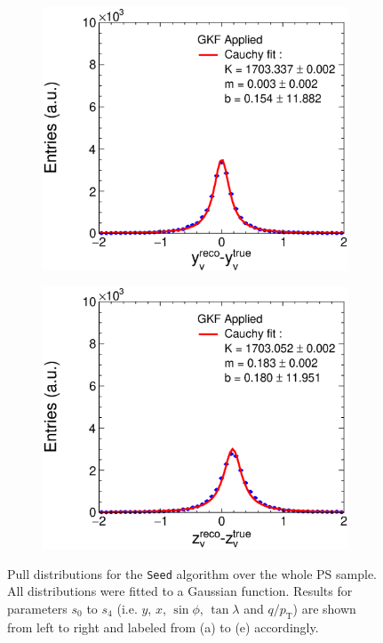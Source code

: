 \begin{figure}[t]
\begin{subfigure}{0.32\textwidth}
         \caption{}
         \label{fig:VertXGKF_Integration}
     \end{subfigure}
     \begin{subfigure}{0.32\textwidth}
         \centering
         \includegraphics[width=\textwidth]{figures/ch5-KF_NDGAr/FullSample/Integration/ResYGKF.eps}
         \caption{}
         \label{fig:VertYGKF_Integration}
     \end{subfigure}
    \begin{subfigure}{0.32\textwidth}
         \centering
         \includegraphics[width=\textwidth]{figures/ch5-KF_NDGAr/FullSample/Integration/ResZGKF.eps}
         \caption{}
         \label{fig:VertZGKF_Integration}
     \end{subfigure}
        \caption{Pull distributions for the \texttt{Seed} algorithm over the whole PS sample. All distributions were fitted to a Gaussian function. Results for parameters $s_0$ to $s_4$ (i.e. $y$, $x$, $\sin\phi$, $\tan\lambda$ and $q/p_{\text{T}}$) are shown from left to right and labeled from (a) to (e) accordingly. }
        \label{fig:Vert_Integration}
\end{figure}
